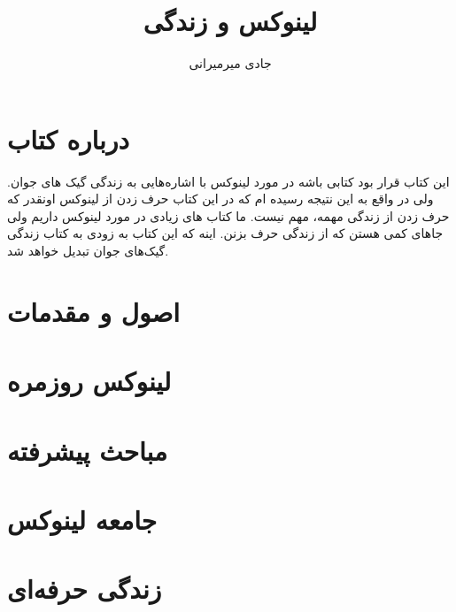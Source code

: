 \documentclass[12pt]{book}
\author{جادی میرمیرانی}
\title{لینوکس و زندگی}
\begin{document}
	\maketitle
	\tableofcontents
	\chapter*{درباره کتاب}
		این کتاب قرار بود کتابی باشه در مورد لینوکس با اشاره‌هایی به زندگی گیک های جوان.
		ولی در واقع به این نتیجه رسیده ام که در این کتاب حرف زدن از لینوکس اونقدر که حرف زدن از زندگی مهمه، مهم نیست. ما کتاب های زیادی در مورد لینوکس داریم ولی جاهای کمی هستن که از زندگی حرف بزنن. اینه که این کتاب به زودی به کتاب زندگی گیک‌های جوان تبدیل خواهد شد. 
		
	\chapter{اصول و  مقدمات}
		
		
		
		
		
	\chapter{لینوکس روزمره}
		
		
		
		
		
		
		
	\chapter{مباحث پیشرفته}
		
		
		
		
	\chapter{جامعه لینوکس}
		
	\chapter{زندگی حرفه‌ای}
		
		
		
		
		
		
		
		
		
		
		
		
		
						
\end{document}
